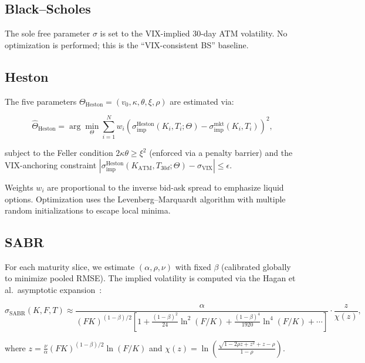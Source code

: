 \documentclass[11pt,a4paper]{article}
\theoremstyle{plain}
\theoremstyle{definition}
\theoremstyle{remark}
\newcommand{\Heston}{\text{Heston}}
\begin{document}
\subsection{Black--Scholes}

The sole free parameter $\sigma$ is set to the VIX-implied 30-day ATM volatility. No optimization is performed; this is the ``VIX-consistent BS'' baseline.

\subsection{Heston}

The five parameters $\Theta_{\Heston} = (v_0, \kappa, \theta, \xi, \rho)$ are estimated via:

\begin{equation}\label{eq:heston_calib}
  \hat{\Theta}_{\Heston} = \arg\min_{\Theta} \sum_{i=1}^{N} w_i \left(\sigma_{\text{imp}}^{\Heston}(K_i, T_i; \Theta) - \sigma_{\text{imp}}^{\text{mkt}}(K_i, T_i)\right)^2,
\end{equation}

subject to the Feller condition $2\kappa\theta \geq \xi^2$ (enforced via a penalty barrier) and the VIX-anchoring constraint $|\sigma_{\text{imp}}^{\Heston}(K_{\text{ATM}}, T_{30d}; \Theta) - \sigma_{\text{VIX}}| \leq \epsilon$.

Weights $w_i$ are proportional to the inverse bid-ask spread to emphasize liquid options. Optimization uses the Levenberg--Marquardt algorithm with multiple random initializations to escape local minima.

\subsection{SABR}

For each maturity slice, we estimate $(\alpha, \rho, \nu)$ with fixed $\beta$ (calibrated globally to minimize pooled RMSE). The implied volatility is computed via the Hagan et al.\ asymptotic expansion~\citep{hagan2002managing}:

\begin{equation}\label{eq:sabr_iv}
  \sigma_{\text{SABR}}(K, F, T) \approx \frac{\alpha}{(FK)^{(1-\beta)/2}\left[1 + \frac{(1-\beta)^2}{24}\ln^2(F/K) + \frac{(1-\beta)^4}{1920}\ln^4(F/K) + \cdots\right]} \cdot \frac{z}{\chi(z)},
\end{equation}

where $z = \frac{\nu}{\alpha}(FK)^{(1-\beta)/2} \ln(F/K)$ and $\chi(z) = \ln\!\left(\frac{\sqrt{1 - 2\rho z + z^2} + z - \rho}{1 - \rho}\right)$.
\end{document}
